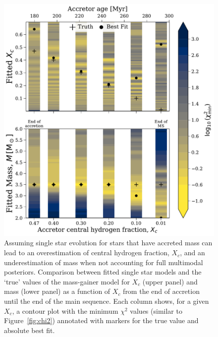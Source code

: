 \documentclass[desactivate]{aa}
\begin{document}
\begin{figure}
    \centering
    \includegraphics[width=\columnwidth]{paper/figures/relative_estimates_psp.pdf}
    \caption{Assuming single star evolution for stars that have accreted mass can lead to an overestimation of central hydrogen fraction, $X_c$, and an underestimation of mass when not accounting for full multimodal posteriors. Comparison between fitted single star models and the `true' values of the mass-gainer model for $X_c$ (upper panel) and mass (lower panel) as a function of $X_c$ from the end of accretion until the end of the main sequence. Each column shows, for a given $X_c$, a contour plot with the minimum $\chi^2$ values (similar to Figure~\ref{fig:chi2}) annotated with markers for the true value and absolute best fit.}
    \label{fig:relative_estimates_psp}
\end{figure}
\end{document}
